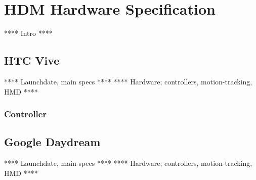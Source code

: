 \section{HDM Hardware Specification}
**** Intro ****
\subsection{HTC Vive}
**** Launchdate, main specs ****
**** Hardware; controllers, motion-tracking, HMD ****
\subsubsection{Controller}
\label{result:hardware:vive:controller}
\subsection{Google Daydream}
**** Launchdate, main specs ****
**** Hardware; controllers, motion-tracking, HMD ****
\label{result:hardware:daydream:controller}
